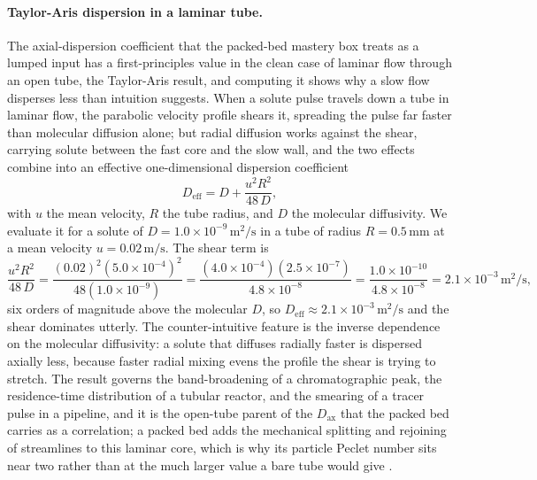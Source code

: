 \paragraph{Taylor-Aris dispersion in a laminar tube.} The axial-dispersion
coefficient that the packed-bed mastery box treats as a lumped input has a
first-principles value in the clean case of laminar flow through an open tube,
the Taylor-Aris result, and computing it shows why a slow flow disperses less
than intuition suggests. When a solute pulse travels down a tube in laminar
flow, the parabolic velocity profile shears it, spreading the pulse far faster
than molecular diffusion alone; but radial diffusion works against the shear,
carrying solute between the fast core and the slow wall, and the two effects
combine into an effective one-dimensional dispersion coefficient
\[
D_{\text{eff}} = D + \frac{u^2 R^2}{48\,D},
\]
with $u$ the mean velocity, $R$ the tube radius, and $D$ the molecular
diffusivity. We evaluate it for a solute of $D = 1.0\times 10^{-9}\,\si{
\meter\squared\per\second}$ in a tube of radius $R = 0.5\,\si{\milli\meter}$ at
a mean velocity $u = 0.02\,\text{m/s}$. The shear term is
\[
\frac{u^2 R^2}{48\,D} = \frac{(0.02)^2(5.0\times 10^{-4})^2}{48(1.0\times
10^{-9})} = \frac{(4.0\times 10^{-4})(2.5\times 10^{-7})}{4.8\times 10^{-8}} =
\frac{1.0\times 10^{-10}}{4.8\times 10^{-8}} = 2.1\times 10^{-3}\,\si{
\meter\squared\per\second},
\]
six orders of magnitude above the molecular $D$, so $D_{\text{eff}} \approx
2.1\times 10^{-3}\,\si{\meter\squared\per\second}$ and the shear dominates
utterly. The counter-intuitive feature is the inverse dependence on the
molecular diffusivity: a solute that diffuses radially faster is dispersed
axially less, because faster radial mixing evens the profile the shear is
trying to stretch. The result governs the band-broadening of a
chromatographic peak, the residence-time distribution of a tubular reactor, and
the smearing of a tracer pulse in a pipeline, and it is the open-tube parent of
the $D_{\text{ax}}$ that the packed bed carries as a correlation; a packed bed
adds the mechanical splitting and rejoining of streamlines to this laminar
core, which is why its particle Peclet number sits near two rather than at the
much larger value a bare tube would give \cite{text:bird-transport-phenomena}.

